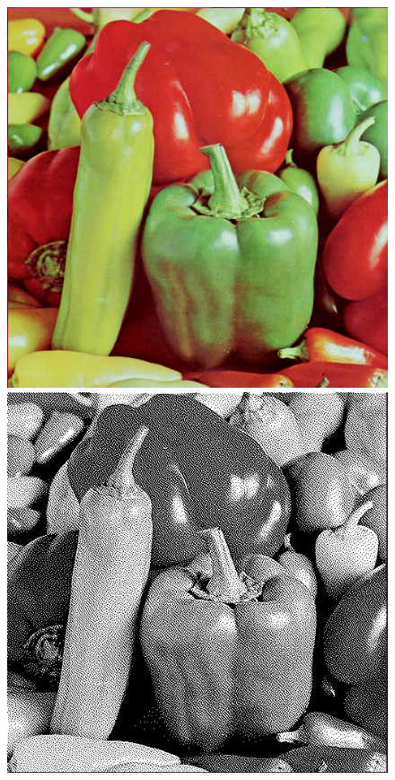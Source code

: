 \documentclass[12pt,openany,a4,usenames,dvipsnames]{book}
\begin{document}
\begin{figure}[H]
  \centering
  \begin{minipage}{0.48\textwidth}
  \includegraphics[width=\textwidth,keepaspectratio]{figures/peppers.png}
  \end{minipage}
  \hspace{.4em}
  \begin{minipage}{0.48\textwidth}
  \includegraphics[width=\textwidth,keepaspectratio]{figures/atkinson_dithering_peppers.png}
  \end{minipage}
\end{figure}
\end{document}
